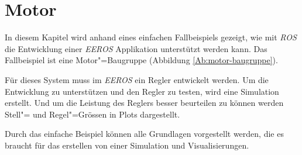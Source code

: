 \chapter{Motor}


In diesem Kapitel wird anhand eines einfachen Fallbeispiels gezeigt, wie mit \textit{ROS} die Entwicklung einer \textit{EEROS} Applikation unterstützt werden kann. 
Das Fallbeispiel ist eine Motor"=Baugruppe (Abbildung \ref{Ab:motor-baugruppe}).

Für dieses System muss im \textit{EEROS} ein Regler entwickelt werden.
Um die Entwicklung zu unterstützen und den Regler zu testen, wird eine Simulation erstellt.
Und um die Leistung des Reglers besser beurteilen zu können werden Stell"= und Regel"=Grössen in Plots dargestellt.


Durch das einfache Beispiel können alle Grundlagen vorgestellt werden, die es braucht für das erstellen von einer Simulation und Visualisierungen.


